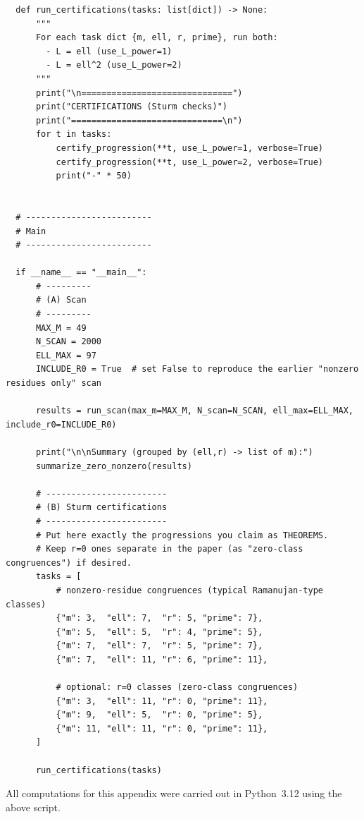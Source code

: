 \documentclass[11pt]{article}
\theoremstyle{definition}
\theoremstyle{remark}
\begin{document}
\begin{verbatim}
  def run_certifications(tasks: list[dict]) -> None:
      """
      For each task dict {m, ell, r, prime}, run both:
        - L = ell (use_L_power=1)
        - L = ell^2 (use_L_power=2)
      """
      print("\n==============================")
      print("CERTIFICATIONS (Sturm checks)")
      print("==============================\n")
      for t in tasks:
          certify_progression(**t, use_L_power=1, verbose=True)
          certify_progression(**t, use_L_power=2, verbose=True)
          print("-" * 50)


  # -------------------------
  # Main
  # -------------------------

  if __name__ == "__main__":
      # ---------
      # (A) Scan
      # ---------
      MAX_M = 49
      N_SCAN = 2000
      ELL_MAX = 97
      INCLUDE_R0 = True  # set False to reproduce the earlier "nonzero residues only" scan

      results = run_scan(max_m=MAX_M, N_scan=N_SCAN, ell_max=ELL_MAX, include_r0=INCLUDE_R0)

      print("\n\nSummary (grouped by (ell,r) -> list of m):")
      summarize_zero_nonzero(results)

      # ------------------------
      # (B) Sturm certifications
      # ------------------------
      # Put here exactly the progressions you claim as THEOREMS.
      # Keep r=0 ones separate in the paper (as "zero-class congruences") if desired.
      tasks = [
          # nonzero-residue congruences (typical Ramanujan-type classes)
          {"m": 3,  "ell": 7,  "r": 5, "prime": 7},
          {"m": 5,  "ell": 5,  "r": 4, "prime": 5},
          {"m": 7,  "ell": 7,  "r": 5, "prime": 7},
          {"m": 7,  "ell": 11, "r": 6, "prime": 11},

          # optional: r=0 classes (zero-class congruences)
          {"m": 3,  "ell": 11, "r": 0, "prime": 11},
          {"m": 9,  "ell": 5,  "r": 0, "prime": 5},
          {"m": 11, "ell": 11, "r": 0, "prime": 11},
      ]

      run_certifications(tasks)

\end{verbatim}


All computations for this appendix were carried out in Python~3.12 using
the above script.
\end{document}
